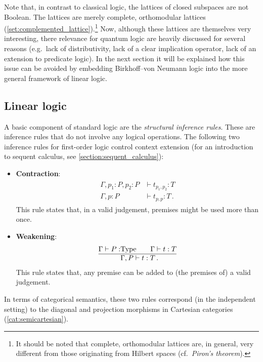     Note that, in contrast to classical logic, the lattices of closed subspaces are not Boolean. The lattices are merely complete, orthomodular lattices (\cref{set:complemented_lattice}).\footnote{It should be noted that complete, orthomodular lattices are, in general, very different from those originating from Hilbert spaces (cf.~\textit{Piron's theorem}).} Now, although these lattices are themselves very interesting, there relevance for quantum logic are heavily discussed for several reasons (e.g.~lack of distributivity, lack of a clear implication operator, lack of an extension to predicate logic). In the next section it will be explained how this issue can be avoided by embedding Birkhoff--von Neumann logic into the more general framework of linear logic.

\subsection{Linear logic}

    A basic component of standard logic are the \textit{structural inference rules}. These are inference rules that do not involve any logical operations. The following two inference rules for first-order logic control context extension (for an introduction to sequent calculus, see \cref{section:sequent_calculus}):
    \begin{itemize}
        \item\textbf{Contraction}:
        \begin{gather}
            \begin{aligned}
                \Gamma,p_1:P,p_2:P &\vdash t_{p_1,p_2}:T\\
                \hline
                \Gamma,p:P &\vdash t_{p,p}:T\,.
            \end{aligned}
        \end{gather}
        This rule states that, in a valid judgement, premises might be used more than once.
        \item\textbf{Weakening}:
        \begin{gather}
            \begin{aligned}
                \Gamma\vdash P:&\mathrm{Type}\qquad\Gamma\vdash t:T\\
                \hline
                &\Gamma,P\vdash t:T\,.
            \end{aligned}
        \end{gather}
        This rule states that, any premise can be added to (the premises of) a valid judgement.
    \end{itemize}
    In terms of categorical semantics, these two rules correspond (in the independent setting) to the diagonal and projection morphisms in Cartesian categories (\cref{cat:semicartesian}).

